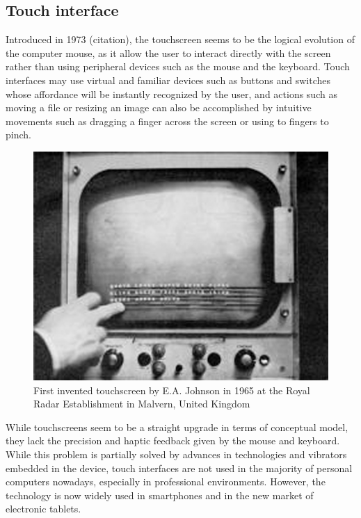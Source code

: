 \documentclass[a4paper,11pt] {article}
\theoremstyle{definition}
\begin{document}
    \subsection{Touch interface}

    Introduced in 1973 (citation), the touchscreen seems to be the logical evolution of the computer mouse, as it allow the user to interact directly with the screen rather than using peripheral devices such as the mouse and the keyboard. Touch interfaces may use virtual and familiar devices such as buttons and switches whose affordance will be instantly recognized by the user, and actions such as moving a file or resizing an image can also be accomplished by intuitive movements such as dragging a finger across the screen or using to fingers to pinch.\\
\begin{figure}[!h]
\centering
\includegraphics[scale=2]{fig-report/first-touchscreen.jpg}
\caption{First invented touchscreen by E.A. Johnson in 1965 at the Royal Radar Establishment in Malvern, United Kingdom\cite{first-touchscreen}}
\end{figure}
    While touchscreens seem to be a straight upgrade in terms of conceptual model, they lack the precision and haptic feedback given by the mouse and keyboard. While this problem is partially solved by advances in technologies and vibrators embedded in the device, touch interfaces are not used in the majority of personal computers nowadays, especially in professional environments. However, the technology is now widely used in smartphones and in the new market of electronic tablets.
\end{document}
